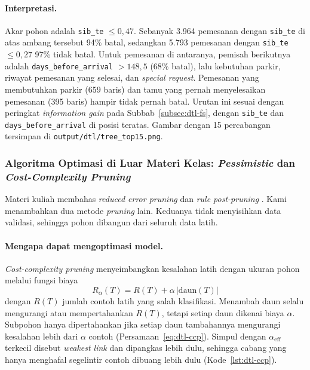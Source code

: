 \paragraph{Interpretasi.} Akar pohon adalah \texttt{sib\_te} $\le 0{,}47$. Sebanyak 3.964 pemesanan
dengan \texttt{sib\_te} di atas ambang tersebut 94\% batal, sedangkan 5.793 pemesanan dengan
\texttt{sib\_te} $\le 0{,}27$ 97\% tidak batal. Untuk pemesanan di antaranya, pemisah berikutnya
adalah \texttt{days\_before\_arrival} $> 148{,}5$ (68\% batal), lalu kebutuhan parkir, riwayat
pemesanan yang selesai, dan \textit{special request}. Pemesanan yang membutuhkan parkir (659 baris)
dan tamu yang pernah menyelesaikan pemesanan (395 baris) hampir tidak pernah batal. Urutan ini sesuai
dengan peringkat \textit{information gain} pada Subbab~\ref{subsec:dtl-fs}, dengan \texttt{sib\_te}
dan \texttt{days\_before\_arrival} di posisi teratas. Gambar dengan 15 percabangan tersimpan di
\nolinkurl{output/dtl/tree_top15.png}.

\subsubsection{Algoritma Optimasi di Luar Materi Kelas: \textit{Pessimistic} dan \textit{Cost-Complexity Pruning}}

Materi kuliah membahas \textit{reduced error pruning} dan \textit{rule post-pruning}
\cite{slide-dtl-issues}. Kami menambahkan dua metode \textit{pruning} lain. Keduanya tidak
menyisihkan data validasi, sehingga pohon dibangun dari seluruh data latih.

\paragraph{Mengapa dapat mengoptimasi model.} \textit{Cost-complexity pruning}
\cite{breiman1984cart} menyeimbangkan kesalahan latih dengan ukuran pohon melalui fungsi biaya
\begin{equation}
	R_\alpha(T) = R(T) + \alpha\,|\text{daun}(T)|
\end{equation}
dengan $R(T)$ jumlah contoh latih yang salah klasifikasi. Menambah daun selalu mengurangi atau
mempertahankan $R(T)$, tetapi setiap daun dikenai biaya $\alpha$. Subpohon hanya dipertahankan jika
setiap daun tambahannya mengurangi kesalahan lebih dari $\alpha$ contoh (Persamaan~\eqref{eq:dtl-ccp}).
Simpul dengan $\alpha_{\text{eff}}$ terkecil disebut \textit{weakest link} dan dipangkas lebih dulu,
sehingga cabang yang hanya menghafal segelintir contoh dibuang lebih dulu
(Kode~\ref{lst:dtl-ccp}).

